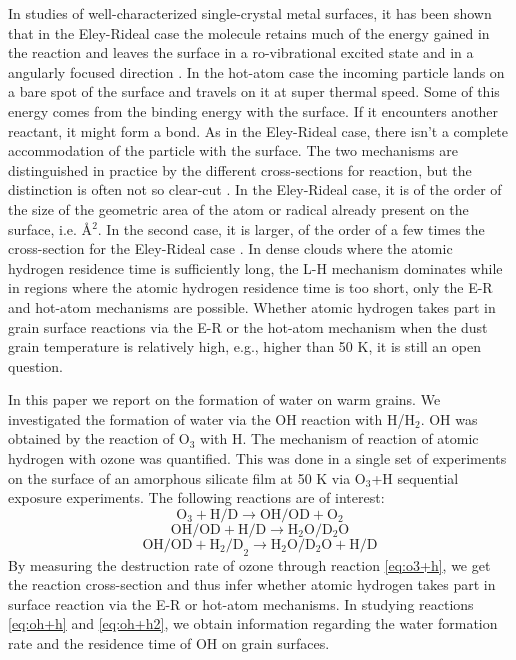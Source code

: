 \documentclass[iop]{emulateapj}
\begin{document}
In studies of well-characterized single-crystal metal surfaces, it has been shown that in the Eley-Rideal case the molecule retains much of the energy gained in the reaction and  leaves the surface in a ro-vibrational excited state \citep{Rettner1992} and in a angularly focused direction \citep{Quattrucci2005}. In the hot-atom case the incoming particle lands on a  bare spot of the surface and travels on it at super thermal speed. Some of this energy comes from the binding energy with the surface. If it encounters another reactant, it might form a bond. As in the Eley-Rideal case, there isn't a complete accommodation  of the particle with the surface. The two mechanisms are distinguished in practice by the different cross-sections for reaction, but the distinction is often not so clear-cut \citep{Kim1999}. In the Eley-Rideal case, it is of the order of the size of the geometric area of the atom or radical already present on the surface, i.e. \AA$^2$. In the second case, it is larger, of the order of a few times the cross-section for the Eley-Rideal case \citep{Guvenc2001}. In dense clouds where the atomic hydrogen residence time is sufficiently long, the L-H mechanism dominates while in regions where the atomic hydrogen residence time is too short, only the E-R and hot-atom mechanisms are possible. Whether atomic hydrogen takes part in grain surface reactions via the E-R or the hot-atom mechanism when the dust grain temperature is relatively high, e.g., higher than 50 K, it is still an open question. 

In this paper we report on the formation of water on warm grains. We investigated  the formation of water via the OH reaction with H/H$_2$. OH was obtained by the reaction of O$_3$ with H. The mechanism of  reaction of atomic hydrogen with ozone was quantified.  This was done  in a single set of experiments on the  surface of an amorphous silicate film at 50 K via  O$_3$+H sequential exposure experiments. The following reactions are of interest:
\begin{equation}
 \text{O}_3+\text{H/D}\rightarrow \text{OH/OD}+\text{O}_2
 \label{eq:o3+h}
\end{equation}
\begin{equation}
 \text{OH/OD}+\text{H/D}\rightarrow\text{H}_2\text{O}/\text{D}_2\text{O}
 \label{eq:oh+h}
\end{equation}
\begin{equation}
  \text{OH/OD}+\text{H}_2\text{/D}_2\rightarrow\text{H}_2\text{O}/\text{D}_2\text{O}+\text{H/D}
   \label{eq:oh+h2}
\end{equation}
By measuring the destruction rate of ozone through reaction \ref{eq:o3+h}, we  get  the reaction cross-section and thus infer whether atomic hydrogen takes part in surface reaction via the E-R or hot-atom mechanisms. In studying reactions \ref{eq:oh+h} and \ref{eq:oh+h2}, we  obtain information regarding the water formation rate and  the residence time of OH on grain surfaces. 
\end{document}
